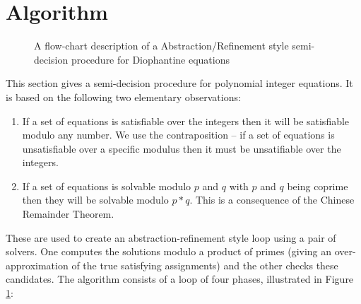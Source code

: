 \section{Algorithm}
\label{section:algorithm}

\begin{figure}[th]
  \begin{center}
      
  \end{center}
  \caption{A flow-chart description of a Abstraction/Refinement style semi-decision procedure for Diophantine equations}
  \label{figure:algorithm}
\end{figure}


This section gives a semi-decision procedure for polynomial integer
equations.
%
It is based on the following two elementary observations:
%
\begin{enumerate}
\item{If a set of equations is satisfiable over the integers then it
  will be satisfiable modulo any number.  We use the contraposition -- if a
  set of equations is unsatisfiable over a specific modulus then it
  must be unsatifiable over the integers.}
\item{If a set of equations is solvable modulo $p$ and $q$ with $p$ and
  $q$ being coprime then they will be solvable modulo $p*q$.  This is a
  consequence of the Chinese Remainder Theorem.}
\end{enumerate}
%
These are used to create an abstraction-refinement style loop using a pair
of solvers.  One computes the solutions modulo a product of primes
(giving an over-approximation of the true satisfying assignments) and
the other checks these candidates.
%
The algorithm consists of a loop of four phases, illustrated in Figure
\ref{figure:algorithm}:

